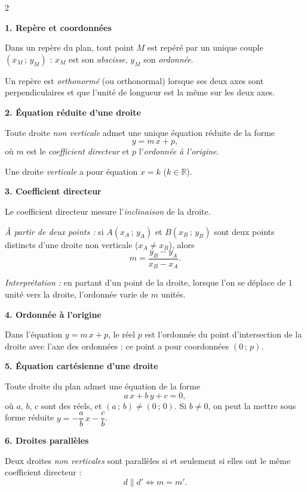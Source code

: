 \documentclass[11pt,a4paper]{article}
\begin{document}
\small
\begin{multicols}{2}

\noindent\textbf{1. Repère et coordonnées}

Dans un repère du plan, tout point $M$ est repéré par un unique couple
$(x_M\,;\,y_M)$ : $x_M$ est son \emph{abscisse}, $y_M$ son \emph{ordonnée}.

Un repère est \emph{orthonormé} (ou orthonormal) lorsque ses deux axes sont
perpendiculaires et que l'unité de longueur est la même sur les deux axes.

\medskip
\noindent\textbf{2. Équation réduite d'une droite}

Toute droite \emph{non verticale} admet une unique équation réduite de la forme
\[
y = m\,x + p,
\]
où $m$ est le \emph{coefficient directeur} et $p$ l'\emph{ordonnée à l'origine}.

Une droite \emph{verticale} a pour équation $x = k$ ($k \in \mathbb{R}$).

\medskip
\noindent\textbf{3. Coefficient directeur}

Le coefficient directeur mesure l'\emph{inclinaison} de la droite.

\emph{À partir de deux points :} si $A(x_A\,;\,y_A)$ et $B(x_B\,;\,y_B)$ sont
deux points distincts d'une droite non verticale ($x_A \neq x_B$), alors
\[
m = \frac{y_B - y_A}{x_B - x_A}.
\]

\emph{Interprétation :} en partant d'un point de la droite, lorsque l'on se
déplace de $1$ unité vers la droite, l'ordonnée varie de $m$ unités.

\medskip
\noindent\textbf{4. Ordonnée à l'origine}

Dans l'équation $y = m\,x + p$, le réel $p$ est l'ordonnée du point
d'intersection de la droite avec l'axe des ordonnées : ce point a pour
coordonnées $(0\,;\,p)$.

\medskip
\noindent\textbf{5. Équation cartésienne d'une droite}

Toute droite du plan admet une équation de la forme
\[
a\,x + b\,y + c = 0,
\]
où $a$, $b$, $c$ sont des réels, et $(a\,;\,b) \neq (0\,;\,0)$.
Si $b \neq 0$, on peut la mettre sous forme réduite
$y = -\dfrac{a}{b}\,x - \dfrac{c}{b}$.

\medskip
\noindent\textbf{6. Droites parallèles}

Deux droites \emph{non verticales} sont parallèles si et seulement si elles
ont le même coefficient directeur :
\[
d \parallel d' \iff m = m'.
\]


\end{multicols}
\end{document}

